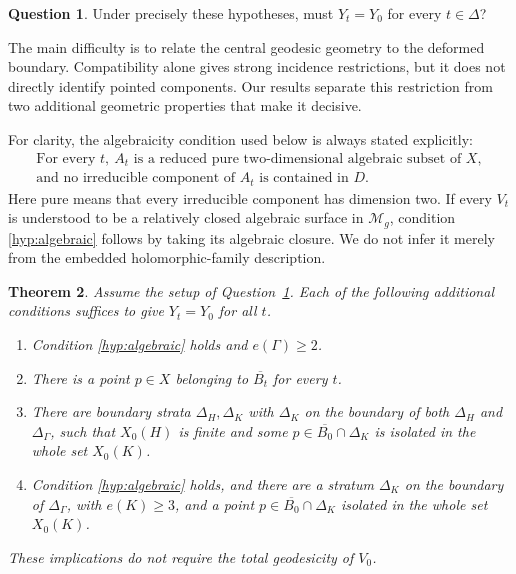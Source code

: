 \documentclass[11pt]{article}
\newcommand{\M}{\mathcal M}
\newcommand{\cl}[1]{\overline{#1}}
\newtheorem{theorem}{Theorem}[section]
\theoremstyle{definition}
\newtheorem{question}[theorem]{Question}
\theoremstyle{remark}
\begin{document}
\begin{question}\label{q:original}
Under precisely these hypotheses, must $Y_t=Y_0$ for every $t\in\Delta$?
\end{question}

The main difficulty is to relate the central geodesic geometry to the deformed boundary. Compatibility alone gives strong incidence restrictions, but it does not directly identify pointed components. Our results separate this restriction from two additional geometric properties that make it decisive.

For clarity, the algebraicity condition used below is always stated explicitly:
\begin{equation}\tag{A}\label{hyp:algebraic}
 \begin{gathered}
 \text{For every }t,\ A_t\text{ is a reduced pure two-dimensional algebraic subset of }X,\\
 \text{and no irreducible component of }A_t\text{ is contained in }D.
 \end{gathered}
\end{equation}
Here pure means that every irreducible component has dimension two. If every $V_t$ is understood to be a relatively closed algebraic surface in $\M_g$, condition \eqref{hyp:algebraic} follows by taking its algebraic closure. We do not infer it merely from the embedded holomorphic-family description.

\begin{theorem}\label{thm:main}
Assume the setup of Question~\ref{q:original}. Each of the following additional conditions suffices to give $Y_t=Y_0$ for all $t$.
\begin{enumerate}[label=(\alph*),leftmargin=*]
\item\label{main:edges} Condition \eqref{hyp:algebraic} holds and $e(\Gamma)\geq2$.
\item\label{main:common} There is a point $p\in X$ belonging to $\cl{B_t}$ for every $t$.
\item\label{main:finite} There are boundary strata $\Delta_H,\Delta_K$ with $\Delta_K$ on the boundary of both $\Delta_H$ and $\Delta_\Gamma$, such that $X_0(H)$ is finite and some $p\in\cl{B_0}\cap\Delta_K$ is isolated in the whole set $X_0(K)$.
\item\label{main:deep} Condition \eqref{hyp:algebraic} holds, and there are a stratum $\Delta_K$ on the boundary of $\Delta_\Gamma$, with $e(K)\geq3$, and a point $p\in\cl{B_0}\cap\Delta_K$ isolated in the whole set $X_0(K)$.
\end{enumerate}
These implications do not require the total geodesicity of $V_0$.
\end{theorem}
\end{document}
